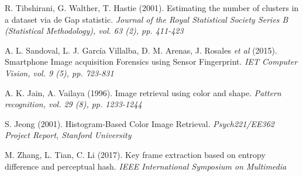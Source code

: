 \begin{thebibliography}{11}
R. Tibshirani, G. Walther, T. Hastie (2001). Estimating the number of clusters in a dataset via de Gap statistic. \textit{Journal of the Royal Statistical Society Series B (Statistical Methodology), vol. 63 (2), pp. 411-423}

A. L. Sandoval, L. J. García Villalba, D. M. Arenas, J. Rosales \textit{et al} (2015). Smartphone Image acquisition Forensics using Sensor Fingerprint. \textit{IET Computer Vision, vol. 9 (5), pp. 723-831}

A. K. Jain, A. Vailaya (1996). Image retrieval using color and shape. \textit{Pattern recognition, vol. 29 (8), pp. 1233-1244}

S. Jeong (2001). Histogram-Based Color Image Retrieval. \textit{Psych221/EE362 Project Report, Stanford University}

M. Zhang, L. Tian, C. Li (2017). Key frame extraction based on entropy difference and perceptual hash. \textit{IEEE International Symposium on Multimedia}

\end{thebibliography}
